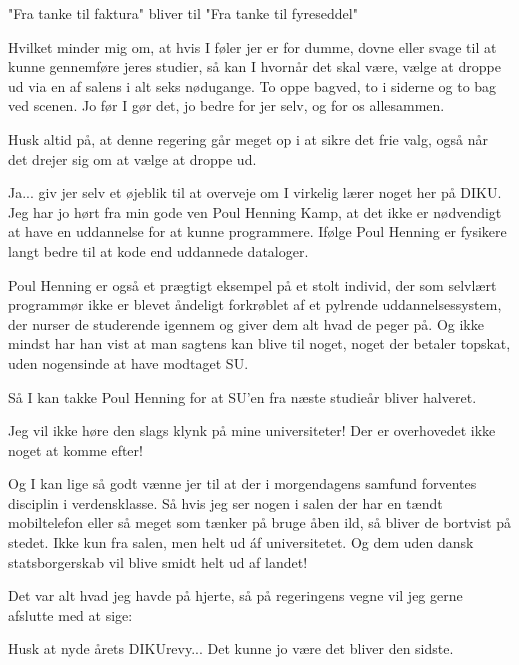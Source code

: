 \documentclass[a4paper,11pt]{article}
\begin{document}
\begin{sketch}
 "Fra tanke til faktura" bliver til "Fra tanke til fyreseddel"

 Hvilket minder mig om, at hvis I føler jer er for dumme, dovne eller svage til at kunne gennemføre jeres studier, så kan I hvornår det skal være, vælge at droppe ud via en af salens i alt seks nødugange. To oppe bagved, to i siderne og to bag ved scenen. Jo før I gør det, jo bedre for jer selv, og for os allesammen.

 Husk altid på, at denne regering går meget op i at sikre det frie valg, også når det drejer sig om at vælge at droppe ud.

 Ja... giv jer selv et øjeblik til at overveje om I virkelig lærer noget her på DIKU. Jeg har jo hørt fra min gode ven Poul Henning Kamp, at det ikke er nødvendigt at have en uddannelse for at kunne programmere. Ifølge Poul Henning er fysikere langt bedre til at kode end uddannede dataloger.


 Poul Henning er også et prægtigt eksempel på et stolt individ, der som selvlært programmør ikke er blevet åndeligt forkrøblet af et pylrende uddannelsessystem, der nurser de studerende igennem og giver dem alt hvad de peger på. Og ikke mindst har han vist at man sagtens kan blive til noget, noget der betaler topskat, uden nogensinde at have modtaget SU.

 Så I kan takke Poul Henning for at SU'en fra næste studieår bliver halveret.


 Jeg vil ikke høre den slags klynk på mine universiteter! Der er overhovedet ikke noget at komme efter!

 Og I kan lige så godt vænne jer til at der i morgendagens samfund forventes disciplin i verdensklasse. Så hvis jeg ser nogen i salen der har en tændt mobiltelefon eller så meget som tænker på bruge åben ild, så bliver de bortvist på stedet. Ikke kun fra salen, men helt ud áf universitetet. Og dem uden dansk statsborgerskab vil blive smidt helt ud af landet!

 Det var alt hvad jeg havde på hjerte, så på regeringens vegne vil jeg gerne afslutte med at sige:

 Husk at nyde årets DIKUrevy... Det kunne jo være det bliver den sidste.


\end{sketch}
\end{document}
